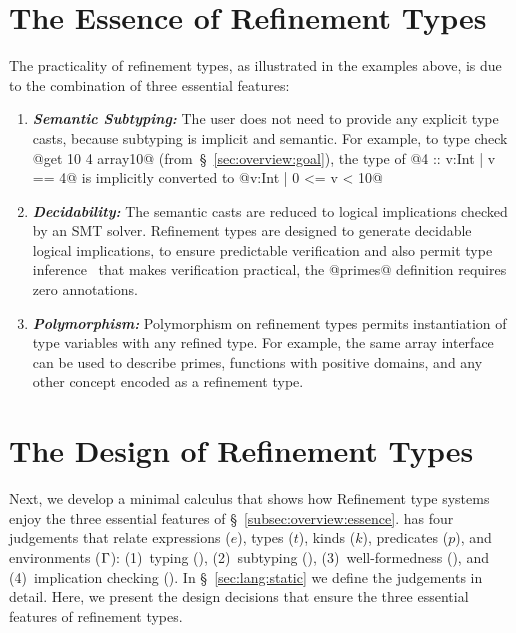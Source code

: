 \section{The Essence of Refinement Types} \label{sec:overview:essence}
%
The practicality of refinement types, as illustrated in the examples above,
is due to the combination of three essential features:
%
\begin{enumerate}[leftmargin=*]

\item \textbf{\textit{Semantic Subtyping:}}
The user does not need to provide any explicit type casts, because
subtyping is implicit and semantic.
%
For example, to type check @get 10 4 array10@ (from~\S~\ref{sec:overview:goal}),
the type of @4 :: {v:Int | v == 4}@ is implicitly converted to @{v:Int | 0 <= v < 10}@

\item \textbf{\textit{Decidability:}}
%
The semantic casts are reduced to logical implications checked by an SMT solver.
Refinement types are designed to generate decidable logical implications,
to ensure predictable verification and also permit type inference~\cite{LiquidPLDI08}
that makes verification practical, \eg the @primes@ definition requires zero annotations.

\item \textbf{\textit{Polymorphism:}}
Polymorphism on refinement types permits instantiation of type variables with any refined type.
For example, the same array interface can be used to describe primes,
functions with positive domains, and any other concept encoded as a refinement type.
\end{enumerate}

\section{The Design of Refinement Types}
\label{sec:overview:design}

Next, we develop a minimal calculus \sysrf that shows how
Refinement type systems enjoy the three essential features
of \S~\ref{subsec:overview:essence}.
%
\sysrf has four judgements that relate expressions ($e$),
types ($t$), kinds ($k$), predicates ($p$), and environments ($\mathrm{\Gamma}$):
%
(1)~typing (),
%
(2)~subtyping (),
%
(3)~well-formedness (\isWellFormed{\tcenv}{\stype}{\skind}),
and
(4)~implication checking ().
%
In \S~\ref{sec:lang:static} we define the judgements in detail.
%
Here, we present the design decisions that ensure the three
essential features of refinement types.


